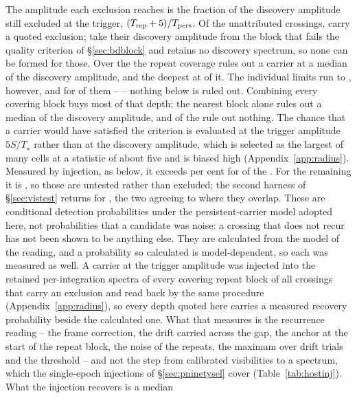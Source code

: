 The amplitude each exclusion reaches is the fraction of the discovery
amplitude still excluded at the trigger, $(T_{\rm rep}+5)/T_{\rm pers}$. Of
the \RcNTested{} unattributed crossings, \RcNExcl{} carry a quoted exclusion;
\RcNWithheld{} take their discovery amplitude from the block that fails the
quality criterion of \S\ref{sec:bdblock} and \RcNNoSpec{} retains no discovery
spectrum, so none can be formed for those. Over the \RcNExcl{} the repeat coverage rules out a carrier at a median
\RcFracMed{} of the discovery amplitude, and the deepest at \RcFracMin{} of
it. The individual limits run to \RcFracMax, however, and for \RcNFracWeak{}
of them -- \RcFracWeakList{} -- nothing below \RcFracWeakLo{} is ruled out.
Combining every covering block buys most of that depth: the nearest block
alone rules out a median \TjFracNearMed{} of the discovery amplitude, and
\TjNNearWeak{} of the \RcNExcl{} rule out nothing. The chance that a carrier would have satisfied the criterion is
evaluated at the trigger amplitude $5S/T_\star$ rather than at the
discovery amplitude, which is selected as the largest of many cells at a
statistic of about five and is biased high (Appendix~\ref{app:radius}). Measured by injection, as below, it exceeds \RcPowerLevel{} per cent for
\HjNPowerHi{} of the \RcNExcl. For the remaining \HjNPowerLo{} it is
\HjLowList, so those are untested rather than excluded; the second harness of
\S\ref{sec:vistest} returns \RjMeasCp{} for \EvBStar, the two agreeing to
\HjCrossDev{} where they overlap. These are conditional detection probabilities
under the persistent-carrier model adopted here, not probabilities that a
candidate was noise: a crossing that does not recur has not been shown to be
anything else. They are calculated from the model of the reading, and a
probability so calculated is model-dependent, so each was measured as well.
A carrier at the trigger amplitude was injected into the retained
per-integration spectra of every covering repeat block of all \HjNMeas{}
crossings that carry an exclusion and read back by the same procedure
(Appendix~\ref{app:radius}), so every depth quoted here carries a measured
recovery probability beside the calculated one. What that measures is the recurrence reading
-- the frame correction, the drift carried across the gap, the anchor at the
start of the repeat block, the noise of the repeats, the maximum over drift
trials and the threshold -- and not the step from calibrated visibilities to a
spectrum, which the single-epoch injections of \S\ref{sec:pninetysel} cover
(Table~\ref{tab:hostinj}). What the injection recovers is a median
